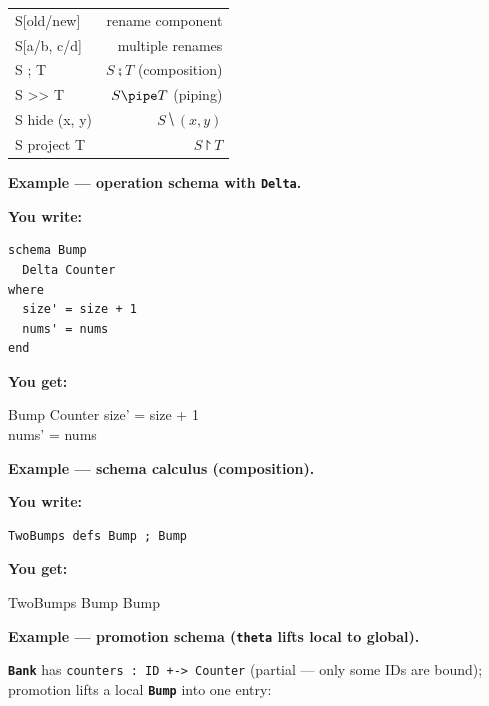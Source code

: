 \documentclass[10pt,landscape,a4paper]{article}
\newcommand{\kw}[1]{\texttt{\bfseries #1}}
\newenvironment{exwrite}%
  {\par\nobreak\noindent\scriptsize\textbf{You write:}\par\nobreak\vspace{0pt}\scriptsize}%
  {\vspace{1pt}\nobreak}
\newenvironment{exget}%
  {\par\nobreak\noindent\scriptsize\textbf{You get:}\par\nobreak\vspace{0pt}\small}%
  {\par\vspace{3pt}}
\begin{document}
\begin{multicols}{2}
\begin{tabularx}{\columnwidth}{LR}
S[old/new]           & rename component \\
S[a/b, c/d]          & multiple renames \\
S ; T                & $S \semi T$ (composition) \\
S >> T               & $S \pipe T$ (piping) \\
S hide (x, y)        & $S \hide (x,y)$ \\
S project T          & $S \project T$ \\
\end{tabularx}

\smallskip
{}
\textbf{Example — operation schema with \kw{Delta}.}

\begin{exwrite}%
\begin{verbatim}
schema Bump
  Delta Counter
where
  size' = size + 1
  nums' = nums
end
\end{verbatim}
\end{exwrite}
\begin{exget}%
\begin{schema}{Bump}
\Delta Counter
\where
size' = size + 1 \\
nums' = nums
\end{schema}
\end{exget}

\smallskip
{}
\textbf{Example — schema calculus (composition).}

\begin{exwrite}%
\begin{verbatim}
TwoBumps defs Bump ; Bump
\end{verbatim}
\end{exwrite}
\begin{exget}%
\begin{zed}
TwoBumps  Bump \semi Bump
\end{zed}
\end{exget}

\smallskip
{}
\textbf{Example — promotion schema (\kw{theta} lifts local to global).}

{\scriptsize \kw{Bank} has \texttt{counters : ID +-> Counter} (partial — only some IDs are bound); promotion lifts a local \kw{Bump} into one entry:}


\end{multicols}
\end{document}

